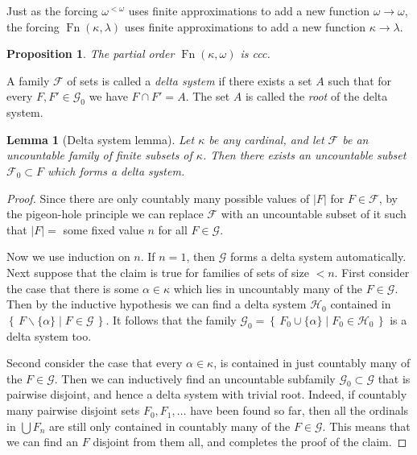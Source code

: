 \documentclass[11pt,oneside]{amsbook}
\newcommand{\set}[1]{\left\{\,#1\,\right\}}
\DeclareMathOperator{\Fn}{Fn}
\theoremstyle{definition}
\theoremstyle{plain}
\newtheorem{lem}[thm]{Lemma}
\newtheorem{prop}[thm]{Proposition}
\theoremstyle{definition}
\theoremstyle{remark}
\begin{document}
Just as the forcing $\omega^{<\omega}$ uses finite approximations to add a new function $\omega\to\omega$, the forcing $\Fn(\kappa,\lambda)$ uses finite approximations to add a new function $\kappa\to\lambda$.

\begin{prop}
  \label{prop:cohen-ccc}
  The partial order $\Fn(\kappa,\omega)$ is ccc.
\end{prop}

A family $\mathcal F$ of sets is called a \emph{delta system} if there exists a set $A$ such that for every $F,F'\in\mathcal G_0$ we have $F\cap F'=A$. The set $A$ is called the \emph{root} of the delta system.

\begin{lem}[Delta system lemma]
  \label{lem:delta-system}
  Let $\kappa$ be any cardinal, and let $\mathcal F$ be an uncountable family of finite subsets of $\kappa$. Then there exists an uncountable subset $\mathcal F_0\subset F$ which forms a delta system.
\end{lem}

\begin{proof}
  Since there are only countably many possible values of $|F|$ for $F\in\mathcal F$, by the pigeon-hole principle we can replace $\mathcal F$ with an uncountable subset of it such that $|F|=$ some fixed value $n$ for all $F\in\mathcal G$.

  Now we use induction on $n$. If $n=1$, then $\mathcal G$ forms a delta system automatically. Next suppose that the claim is true for families of sets of size $<n$. First consider the case that there is some $\alpha\in\kappa$ which lies in uncountably many of the $F\in\mathcal G$. Then by the inductive hypothesis we can find a delta system $\mathcal H_0$ contained in $\set{F\smallsetminus\{\alpha\}\mid F\in\mathcal G}$. It follows that the family $\mathcal G_0=\set{F_0\cup\{\alpha\}\mid F_0\in\mathcal H_0}$ is a delta system too.

  Second consider the case that every $\alpha\in\kappa$, is contained in just countably many of the $F\in\mathcal G$. Then we can inductively find an uncountable subfamily $\mathcal G_0\subset\mathcal G$ that is pairwise disjoint, and hence a delta system with trivial root. Indeed, if countably many pairwise disjoint sets $F_0,F_1,\ldots$ have been found so far, then all the ordinals in $\bigcup F_n$ are still only contained in countably many of the $F\in\mathcal G$. This means that we can find an $F$ disjoint from them all, and completes the proof of the claim.
\end{proof}
\end{document}

